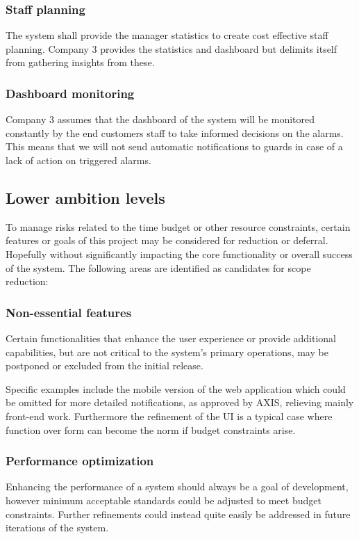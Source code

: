 \documentclass{article}
\begin{document}
\subsubsection{Staff planning}
The system shall provide the manager statistics to create cost effective staff planning. Company 3 provides the statistics and dashboard but delimits itself from gathering insights from these.

\subsubsection{Dashboard monitoring}
Company 3 assumes that the dashboard of the system will be monitored constantly by the end customers staff to take informed decisions on the alarms. This means that we will not send automatic notifications to guards in case of a lack of action on triggered alarms.

\subsection{Lower ambition levels}
To manage risks related to the time budget or other resource constraints, certain features or goals of this project may be considered for reduction or deferral. Hopefully without significantly impacting the core functionality or overall success of the system. The following areas are identified as candidates for scope reduction:

\subsubsection{Non-essential features}
Certain functionalities that enhance the user experience or provide additional capabilities, but are not critical to the system's primary operations, may be postponed or excluded from the initial release. 

Specific examples include the mobile version of the web application which could be omitted for more detailed notifications, as approved  by AXIS, relieving mainly front-end work. Furthermore the refinement of the UI is a typical case where function over form can become the norm if budget constraints arise.

\subsubsection{Performance optimization}
Enhancing the performance of a system should always be a goal of development, however minimum acceptable standards could be adjusted to meet budget constraints. Further refinements could instead quite easily be addressed in future iterations of the system.
\end{document}

